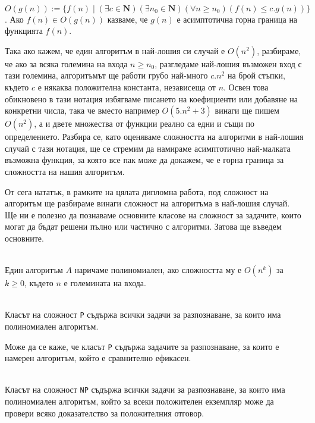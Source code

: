 \documentclass[12pt,twoside,a4paper]{article}
\begin{document}
	\begin{definition}~\\
		\indent $O(g(n)) := \{f(n) \mid (\exists c \in \mathbf{N})(\exists n_0 \in \mathbf{N})(\forall n \ge n_0)(f(n) \le c.g(n))\}$. Ако $f(n) \in O(g(n))$ казваме, че $g(n)$ е асимптотична горна граница на функцията $f(n)$.
	\end{definition}
	Така ако кажем, че един алгоритъм в най-лошия си случай е $O(n^2)$, разбираме, че ако за всяка големина на входа $n \ge n_0$, разгледаме най-лошия възможен вход с тази големина, алгоритъмът ще работи грубо най-много $c.n^2$ на брой стъпки, където $c$ е някаква положителна константа, независеща от $n$. Освен това обикновено в тази нотация избягваме писането на коефициенти или добавяне на конкретни числа, така че вместо например $O(5.n^2+3)$ винаги ще пишем $O(n^2)$, а и двете множества от функции реално са едни и същи по определението. Разбира се, като оценяваме сложността на алгоритми в най-лошия случай с тази нотация, ще се стремим да намираме асимптотично най-малката възможна функция, за която все пак може да докажем, че е горна граница за сложността на нашия алгоритъм.
	
	От сега нататък, в рамките на цялата дипломна работа, под сложност на алгоритъм ще разбираме винаги сложност на алгоритъма в най-лошия случай. Ще ни е полезно да познаваме основните класове на сложност за задачите, които могат да бъдат решени пълно или частично с алгоритми. Затова ще въведем основните.
	
	\begin{definition}~\\
		\indent Един алгоритъм $A$ наричаме полиномиален, ако сложността му е $O(n^k)$ за $k \ge 0$, където $n$ е големината на входа.
	\end{definition}
	
	\begin{definition}~\\
		\indent Класът на сложност \texttt{P} съдържа всички задачи за разпознаване, за които има полиномиален алгоритъм. 
	\end{definition}
	
	Може да се каже, че класът \texttt{P} съдържа задачите за разпознаване, за които е намерен алгоритъм, който е сравнително ефикасен.
	
	\begin{definition}~\\
		\indent Класът на сложност \texttt{NP} съдържа всички задачи за разпознаване, за които има полиномиален алгоритъм, който за всеки положителен екземпляр може да провери всяко доказателство за положителния отговор.
	\end{definition}
	
\end{document}
